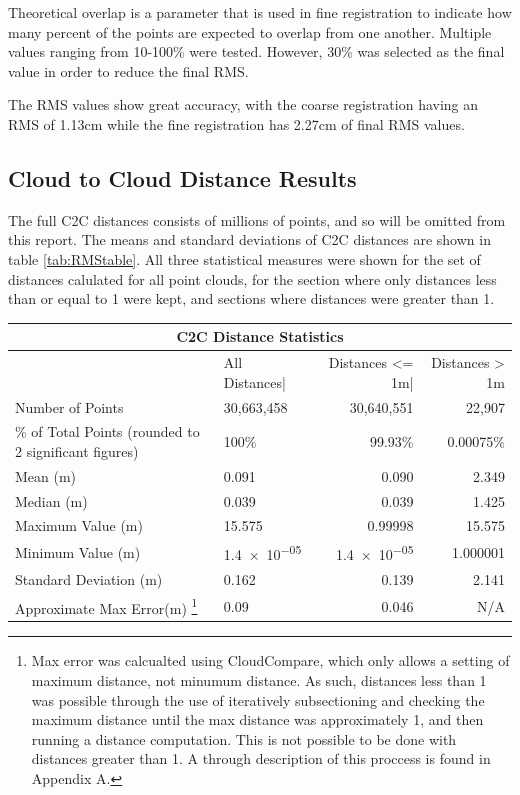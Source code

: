 \documentclass[man]{apa7}
\begin{document}
Theoretical overlap is a parameter that is used in fine registration to indicate how many percent of the points are expected to overlap from one another. Multiple values ranging from 10-100\% were tested. However, 30\% was selected as the final value in order to reduce the final RMS.

The RMS values show great accuracy, with the coarse registration having an RMS of 1.13cm while the fine registration has 2.27cm of final RMS values.


\subsection{Cloud to Cloud Distance Results}

The full C2C distances consists of millions of points, and so will be omitted from this report. The means and standard deviations of C2C distances are shown in table \ref{tab:RMStable}. All three statistical measures were shown for the set of distances calulated for all point clouds, for the section where only distances less than or equal to 1 were kept, and sections where distances were greater than 1.

\begin{minipage}{\linewidth}
  \small
  \setlength{\tabcolsep}{3pt} %
  \renewcommand{\arraystretch}{0.8} %
  \label{tab:RMStable}
  \begin{tabular}{@{}llrr@{}}         \toprule
  \multicolumn{4}{c}{C2C Distance Statistics }        \\ \toprule{}
  &  All Distances|    & Distances <= 1m| & Distances > 1m \\ \midrule
  Number of Points & 30,663,458  & 30,640,551  & 22,907  \\
  \% of Total Points (rounded to 2 significant figures) & 100\% & 99.93\% & 0.00075\% \\
  Mean (m)      & 0.091 & 0.090 & 2.349  \\
  Median (m)    & 0.039 &  0.039  & 1.425   \\
  Maximum Value (m)       & 15.575  & 0.99998  & 15.575   \\
  Minimum Value (m)       & \num{1.4e-05}  & \num{1.4e-05} & 1.000001  \\
  Standard Deviation (m)  & 0.162  & 0.139 & 2.141 \\ 
  Approximate Max Error(m) \footnote{Max error was calcualted using CloudCompare, which only allows a setting of maximum distance, not minumum distance. As such, distances less than 1 was possible through the use of iteratively subsectioning and checking the maximum distance until the max distance was approximately 1, and then running a distance computation. This is not possible to be done with distances greater than 1. A through description of this proccess is found in Appendix A.} & 0.09 &  0.046 & N/A \\ \bottomrule
  \end{tabular}
\end{minipage}
\end{document}
